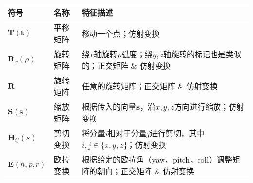 \documentclass[
  paper=a4,
  ,captions=tableheading
]{scrartcl}
\begin{document}
\begin{longtable}[]{@{}
  >{\raggedright\arraybackslash}p{}
  >{\raggedright\arraybackslash}p{}
  >{\raggedright\arraybackslash}p{}@{}}
  \toprule\noalign{}
  \begin{minipage}[b]{\linewidth}\raggedright
    符号
  \end{minipage}      & \begin{minipage}[b]{\linewidth}\raggedright
                          名称
                        \end{minipage} & \begin{minipage}[b]{\linewidth}\raggedright
                                           特征描述
                                         \end{minipage}                                            \\
  \midrule\noalign{}
  \endhead
  \bottomrule\noalign{}
  \endlastfoot
  \(\mathbf{T(t)}\)                                & 平移矩阵                                        & 移动一个点；仿射变换                  \\
  \(\mathbf{R}_x(\rho)\)                           & 旋转矩阵                                        & 绕\(x\)轴旋转\(\rho\)弧度；绕\(y,z\)轴旋转的标记也是类似的；正交矩阵 \& 仿射变换                                                                                                   \\
  \(\mathbf{R}\)                                   & 旋转矩阵                                        & 任意的旋转矩阵；正交矩阵 \& 仿射变换        \\
  \(\mathbf{S(s)}\)                                & 缩放矩阵                                        &
  根据传入的向量\(\mathbf{s}\)，沿\(x,y,z\)方向进行缩放；仿射变换                                                                                  \\
  \(\mathbf{H}_{ij}(s)\)                           & 剪切变换                                        &
  将分量\(i\)相对于分量\(j\)进行剪切，其中\(i,j \in \{ x,y,z \}\)；仿射变换                                                                        \\
  \(\mathbf{E}(h,p,r)\)                            & 欧拉变换                                        &
  根据给定的欧拉角（yaw，pitch，roll）调整矩阵的朝向；正交矩阵 \&
  仿射变换                                                                                                                         \\

\end{longtable}
\end{document}

